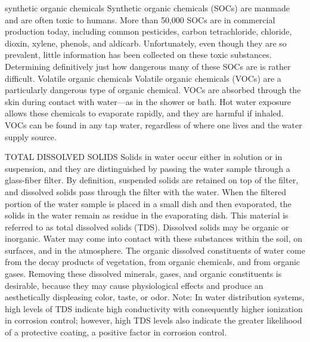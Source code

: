 \documentclass{article}
\begin{document}
synthetic organic chemicals Synthetic organic chemicals (SOCs) are
manmade and are often toxic to humans. More than 50,000 SOCs are in
commercial production today, including common pesticides, carbon
tetrachloride, chloride, dioxin, xylene, phenols, and aldicarb.
Unfortunately, even though they are so prevalent, little information has
been collected on these toxic substances. Determining definitively just
how dangerous many of these SOCs are is rather difficult. Volatile
organic chemicals Volatile organic chemicals (VOCs) are a particularly
dangerous type of organic chemical. VOCs are absorbed through the skin
during contact with water---as in the shower or bath. Hot water exposure
allows these chemicals to evaporate rapidly, and they are harmful if
inhaled. VOCs can be found in any tap water, regardless of where one
lives and the water supply source.

TOTAL DISSOLVED SOLIDS Solids in water occur either in solution or in
suspension, and they are distinguished by passing the water sample
through a glass-fiber filter. By definition, suspended solids are
retained on top of the filter, and dissolved solids pass through the
filter with the water. When the filtered portion of the water sample is
placed in a small dish and then evaporated, the solids in the water
remain as residue in the evaporating dish. This material is referred to
as total dissolved solids (TDS). Dissolved solids may be organic or
inorganic. Water may come into contact with these substances within the
soil, on surfaces, and in the atmosphere. The organic dissolved
constituents of water come from the decay products of vegetation, from
organic chemicals, and from organic gases. Removing these dissolved
minerals, gases, and organic constituents is desirable, because they may
cause physiological effects and produce an aesthetically displeasing
color, taste, or odor. Note: In water distribution systems, high levels
of TDS indicate high conductivity with consequently higher ionization in
corrosion control; however, high TDS levels also indicate the greater
likelihood of a protective coating, a positive factor in corrosion
control.
\end{document}

